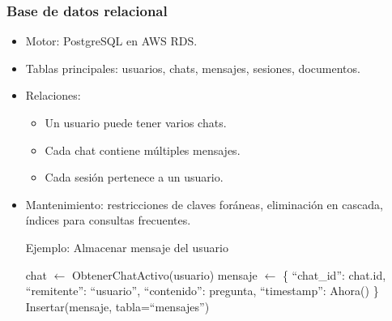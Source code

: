 \begin{enumerate}
            \subsubsection{Base de datos relacional}
            \begin{itemize}
                  \item Motor: PostgreSQL en AWS RDS.
                  \item Tablas principales: usuarios, chats, mensajes, sesiones, documentos.
                  \item Relaciones:
                        \begin{itemize}
                              \item Un usuario puede tener varios chats.
                              \item Cada chat contiene múltiples mensajes.
                              \item Cada sesión pertenece a un usuario.
                        \end{itemize}
                  \item Mantenimiento: restricciones de claves foráneas, eliminación en cascada,
                        índices para consultas frecuentes.
                        \begin{algorithm}[H]
                              \caption{Ejemplo: Almacenar mensaje del usuario}
                              \label{alg:guardar-mensaje}
                              \begin{algorithmic}[1]
                                    \State chat $\gets$ ObtenerChatActivo(usuario)
                                    \State mensaje $\gets$ \{
                                    \Statex \quad ``chat\_id'': chat.id,
                                    \Statex \quad ``remitente'': ``usuario'',
                                    \Statex \quad ``contenido'': pregunta,
                                    \Statex \quad ``timestamp'': Ahora()
                                    \Statex \}
                                    \State Insertar(mensaje, tabla=``mensajes'')
                                    \EndProcedure
                              \end{algorithmic}
                        \end{algorithm}
            \end{itemize}


\end{enumerate}
